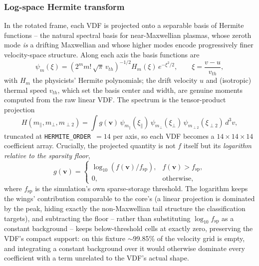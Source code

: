 \documentclass[11pt]{article}
\begin{document}
\subsubsection{Log-space Hermite transform}
In the rotated frame, each VDF is projected onto a separable basis of
Hermite functions -- the natural spectral basis for near-Maxwellian
plasmas, whose zeroth mode \emph{is} a drifting Maxwellian and whose
higher modes encode progressively finer velocity-space structure. Along
each axis the basis functions are
\begin{equation}
\psi_{m}(\xi) = \left(2^{m} m!\,\sqrt{\pi}\,v_{th}\right)^{-1/2}
H_{m}(\xi)\, e^{-\xi^{2}/2}, \qquad
\xi = \frac{v - u}{v_{th}},
\label{eq:hermite-basis}
\end{equation}
with $H_{m}$ the physicists' Hermite polynomials; the drift velocity
$u$ and (isotropic) thermal speed $v_{th}$, which set the basis center
and width, are genuine moments computed from the raw linear VDF. The
spectrum is the tensor-product projection
\begin{equation}
H(m_{\parallel}, m_{\perp}, m_{\perp 2}) =
\int g(\mathbf{v})\,
\psi_{m_{\parallel}}(\xi_{\parallel})\,
\psi_{m_{\perp}}(\xi_{\perp})\,
\psi_{m_{\perp 2}}(\xi_{\perp 2})\, d^{3}v,
\label{eq:hermite-projection}
\end{equation}
truncated at \texttt{HERMITE\_ORDER}~$=14$ per axis, so each VDF
becomes a $14\times14\times14$ coefficient array. Crucially, the
projected quantity is not $f$ itself but its \emph{logarithm relative
to the sparsity floor},
\begin{equation}
g(\mathbf{v}) =
\begin{cases}
\log_{10}\!\left(f(\mathbf{v}) / f_{\mathrm{sp}}\right), & f(\mathbf{v}) > f_{\mathrm{sp}},\\
0, & \text{otherwise},
\end{cases}
\label{eq:log-patch}
\end{equation}
where $f_{\mathrm{sp}}$ is the simulation's own sparse-storage
threshold. The logarithm keeps the wings' contribution comparable to
the core's (a linear projection is dominated by the peak, hiding
exactly the non-Maxwellian tail structure the classification targets),
and subtracting the floor -- rather than substituting
$\log_{10} f_{\mathrm{sp}}$ as a constant background -- keeps
below-threshold cells at exactly zero, preserving the VDF's compact
support: on this fixture $\sim$99.85\% of the velocity grid is empty,
and integrating a constant background over it would otherwise dominate
every coefficient with a term unrelated to the VDF's actual shape.
\end{document}
